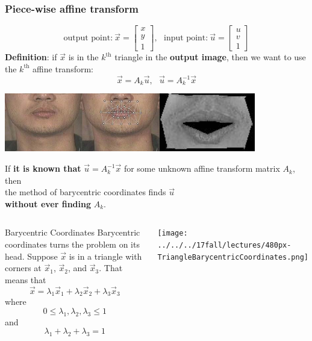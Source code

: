 \documentclass{beamer}
\begin{document}
\begin{frame}
  \frametitle{Piece-wise affine transform}
  \[
  \mbox{output point:}~\vec{x}=\left[\begin{array}{c}x\\y\\1\end{array}\right],~~~
  \mbox{input point:}~\vec{u}=\left[\begin{array}{c}u\\v\\1\end{array}\right]
  \]
  {\bf Definition}: if $\vec{x}$ is in the $k^{\textrm{th}}$ triangle in the
  {\bf output image}, then we want to use the $k^{\textrm{th}}$ affine transform:
  \[
  \vec{x}=A_k \vec{u},~~~\vec{u}=A_k^{-1}\vec{x}
  \]
  \centerline{\includegraphics[height=1in]{mp7_image_warping_points.jpg}\includegraphics[height=1in]{mp7_image_warped.jpg}}
\end{frame}

\begin{frame}
  If {\bf it is known that} $\vec{u}=A_k^{-1}\vec{x}$ for some unknown
  affine transform matrix $A_k$,
  \vspace*{2mm}\\
  then
  \vspace*{2mm}\\
  the method of barycentric
  coordinates finds $\vec{u}$
  \vspace*{2mm}\\
  {\bf without ever finding} $A_k$.
\end{frame}

\begin{frame}
  \begin{columns}[t]
    \column{2.5in}
    \begin{block}{Barycentric Coordinates}
    Barycentric coordinates turns the problem on its head.  Suppose
    $\vec{x}$ is in a triangle with corners at $\vec{x}_1$,
    $\vec{x}_2$, and $\vec{x}_3$. That means that
    \[
    \vec{x}=\lambda_1\vec{x}_1+\lambda_2\vec{x}_2+\lambda_3\vec{x}_3
    \]
    where
    \[
    0\le\lambda_1,\lambda_2,\lambda_3\le 1
    \]
    and
    \[
    \lambda_1+\lambda_2+\lambda_3=1
    \]
    \end{block}
    \column{2.25in}
    \begin{block}{}
      \centerline{\texttt{[image: ../../../17fall/lectures/480px-TriangleBarycentricCoordinates.png]}}
    \end{block}
  \end{columns}
\end{frame}
\end{document}
